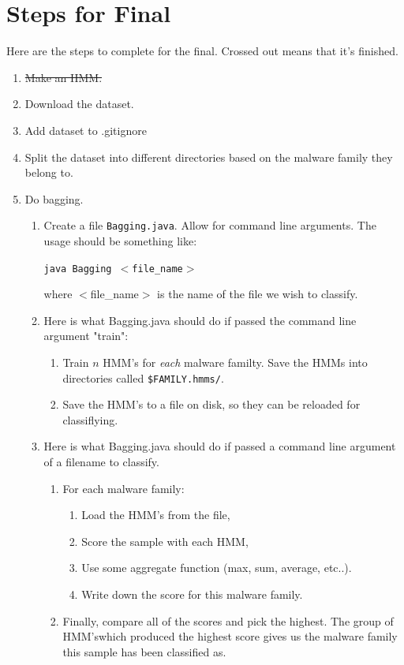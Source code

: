 \documentclass[12pt]{article}
\begin{document}
\section{Steps for Final}
Here are the steps to complete for the final. Crossed out means that it's finished.
\begin{enumerate}
  \item \st{Make an HMM.}
  \item Download the dataset.
  \item Add dataset to .gitignore
  \item Split the dataset into different directories based on the malware family they belong to.
  \item Do bagging.
    \begin{enumerate}
  \item Create a file \texttt{Bagging.java}. Allow for command line arguments. The usage should be something like: 
        
    \texttt{java Bagging $<$file\_name$>$}

    where $<$file\_name$>$ is the name of the file we wish to classify.

  \item Here is what Bagging.java should do if passed the command line argument "train":
    \begin{enumerate}
      \item Train $n$ HMM's for \textit{each} malware familty. Save the HMMs into directories called \texttt{\$FAMILY.hmms/}.
      \item Save the HMM's to a file on disk, so they can be reloaded for classiflying.
    \end{enumerate}

  \item Here is what Bagging.java should do if passed a command line argument of a filename to classify.
    \begin{enumerate}
      \item For each malware family:
        \begin{enumerate}
      \item Load the HMM's from the file,
      \item Score the sample with each HMM,
      \item Use some aggregate function (max, sum, average, etc..).
      \item Write down the score for this malware family.
        \end{enumerate}
      \item Finally, compare all of the scores and pick the highest. The group of HMM'swhich produced the highest score gives us the malware family this sample has been classified as.
    \end{enumerate}
    \end{enumerate}
\end{enumerate}
\end{document}
